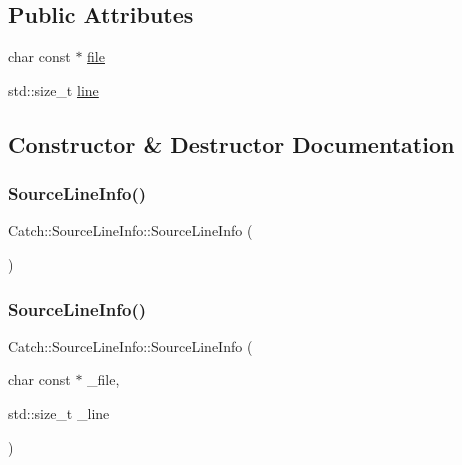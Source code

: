 \subsection*{Public Attributes}
\begin{DoxyCompactItemize}
\item 
char const  $\ast$ \mbox{\hyperlink{structCatch_1_1SourceLineInfo_ad65537703e9f08c1fa7777fbc3f0c617}{file}}
\item 
std\+::size\+\_\+t \mbox{\hyperlink{structCatch_1_1SourceLineInfo_a841e5d696c7b9cde24e45e61dd979c77}{line}}
\end{DoxyCompactItemize}


\subsection{Constructor \& Destructor Documentation}
\mbox{\label{structCatch_1_1SourceLineInfo_a2d80932bb4129b1606d1924a5c44be2f}} 
\subsubsection{\texorpdfstring{Source\+Line\+Info()}{SourceLineInfo()}\hspace{0.1cm}{\footnotesize\ttfamily [1/4]}}
{\footnotesize\ttfamily Catch\+::\+Source\+Line\+Info\+::\+Source\+Line\+Info (\begin{DoxyParamCaption}{ }\end{DoxyParamCaption})\hspace{0.3cm}{\ttfamily [delete]}}

\mbox{\label{structCatch_1_1SourceLineInfo_a48510b82a39a042ab370ed143dd30c10}} 
\subsubsection{\texorpdfstring{Source\+Line\+Info()}{SourceLineInfo()}\hspace{0.1cm}{\footnotesize\ttfamily [2/4]}}
{\footnotesize\ttfamily Catch\+::\+Source\+Line\+Info\+::\+Source\+Line\+Info (\begin{DoxyParamCaption}\item[{char const $\ast$}]{\+\_\+file,  }\item[{std\+::size\+\_\+t}]{\+\_\+line }\end{DoxyParamCaption})\hspace{0.3cm}{\ttfamily [noexcept]}}

